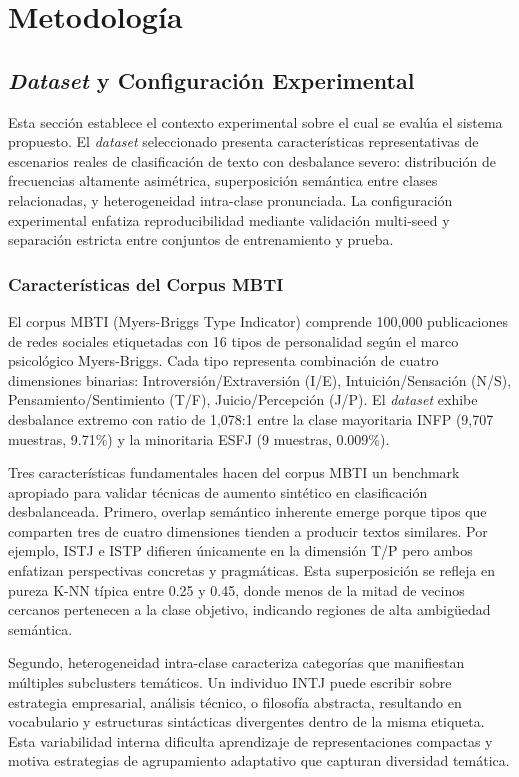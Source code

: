 \chapter{Metodología}
\label{sec:Metodologia}

\section{\textit{Dataset} y Configuración Experimental}
\label{sec:dataset_config}

Esta sección establece el contexto experimental sobre el cual se evalúa el sistema propuesto. El \textit{dataset} seleccionado presenta características representativas de escenarios reales de clasificación de texto con desbalance severo: distribución de frecuencias altamente asimétrica, superposición semántica entre clases relacionadas, y heterogeneidad intra-clase pronunciada. La configuración experimental enfatiza reproducibilidad mediante validación multi-seed y separación estricta entre conjuntos de entrenamiento y prueba.

\subsection{Características del Corpus MBTI}
\label{subsec:corpus_mbti}

El corpus MBTI (Myers-Briggs Type Indicator) comprende 100,000 publicaciones de redes sociales etiquetadas con 16 tipos de personalidad según el marco psicológico Myers-Briggs. Cada tipo representa combinación de cuatro dimensiones binarias: Introversión/Extraversión (I/E), Intuición/Sensación (N/S), Pensamiento/Sentimiento (T/F), Juicio/Percepción (J/P). El \textit{dataset} exhibe desbalance extremo con ratio de 1,078:1 entre la clase mayoritaria INFP (9,707 muestras, 9.71\%) y la minoritaria ESFJ (9 muestras, 0.009\%).

Tres características fundamentales hacen del corpus MBTI un benchmark apropiado para validar técnicas de aumento sintético en clasificación desbalanceada. Primero, overlap semántico inherente emerge porque tipos que comparten tres de cuatro dimensiones tienden a producir textos similares. Por ejemplo, ISTJ e ISTP difieren únicamente en la dimensión T/P pero ambos enfatizan perspectivas concretas y pragmáticas. Esta superposición se refleja en pureza K-NN típica entre 0.25 y 0.45, donde menos de la mitad de vecinos cercanos pertenecen a la clase objetivo, indicando regiones de alta ambigüedad semántica.

Segundo, heterogeneidad intra-clase caracteriza categorías que manifiestan múltiples subclusters temáticos. Un individuo INTJ puede escribir sobre estrategia empresarial, análisis técnico, o filosofía abstracta, resultando en vocabulario y estructuras sintácticas divergentes dentro de la misma etiqueta. Esta variabilidad interna dificulta aprendizaje de representaciones compactas y motiva estrategias de agrupamiento adaptativo que capturan diversidad temática.

